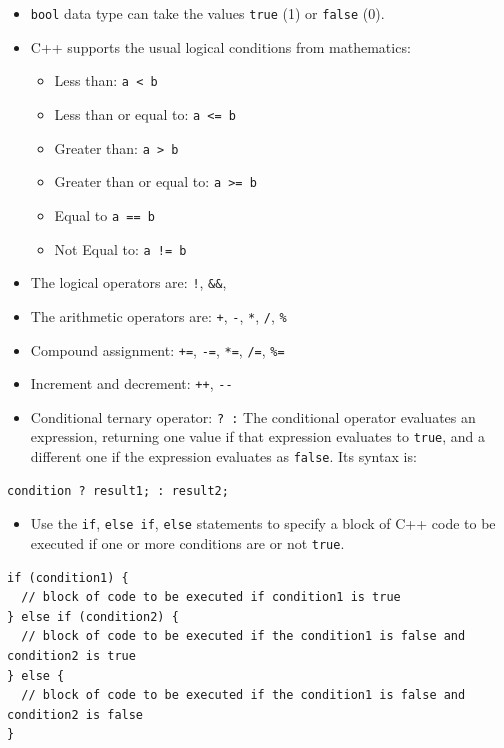 \begin{itemize}
\tightlist
\item
  \texttt{bool} data type can take the values \texttt{true} (1) or \texttt{false} (0).
\item
  C++ supports the usual logical conditions from mathematics:

  \begin{itemize}
  \tightlist
  \item
    Less than: \texttt{a\ \textless{}\ b}
  \item
    Less than or equal to: \texttt{a\ \textless{}=\ b}
  \item
    Greater than: \texttt{a\ \textgreater{}\ b}
  \item
    Greater than or equal to: \texttt{a\ \textgreater{}=\ b}
  \item
    Equal to \texttt{a\ ==\ b}
  \item
    Not Equal to: \texttt{a\ !=\ b}
  \end{itemize}
\item
  The logical operators are: \texttt{!}, \texttt{\&\&}, \texttt{\textbar{}\textbar{}}
\item
  The arithmetic operators are: \texttt{+}, \texttt{-}, \texttt{*}, \texttt{/}, \texttt{\%}
\item
  Compound assignment: \texttt{+=}, \texttt{-=}, \texttt{*=}, \texttt{/=}, \texttt{\%=}
\item
  Increment and decrement: \texttt{++}, \texttt{-\/-}
\item
  Conditional ternary operator: \texttt{?\ :}
  The conditional operator evaluates an expression, returning one value if that expression evaluates to \texttt{true}, and a different one if the expression evaluates as \texttt{false}. Its syntax is:
\end{itemize}

\begin{verbatim}
condition ? result1; : result2;
\end{verbatim}

\begin{itemize}
\tightlist
\item
  Use the \texttt{if}, \texttt{else\ if}, \texttt{else} statements to specify a block of C++ code to be executed if one or more conditions are or not \texttt{true}.
\end{itemize}

\begin{verbatim}
if (condition1) {
  // block of code to be executed if condition1 is true
} else if (condition2) {
  // block of code to be executed if the condition1 is false and condition2 is true
} else {
  // block of code to be executed if the condition1 is false and condition2 is false
}
\end{verbatim}

